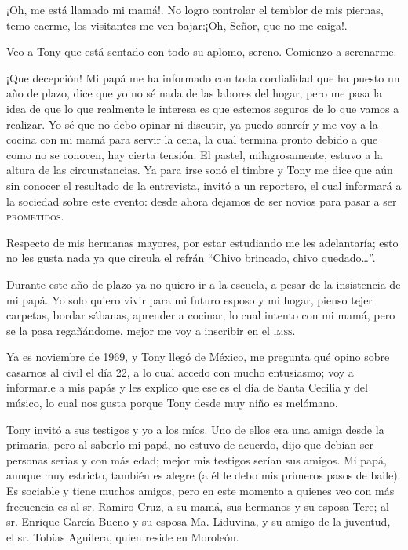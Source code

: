\documentclass[letterpaper, 12pt]{book}
\begin{document}
¡Oh, me está llamado mi mamá!. No logro controlar el temblor de mis piernas, temo caerme, los visitantes me ven bajar:¡Oh, Señor, que no me caiga!.

Veo a Tony que está sentado con todo su aplomo, sereno. Comienzo a serenarme.

¡Que decepción! Mi papá me ha informado con toda cordialidad que ha puesto un año de plazo, dice que yo no sé nada de las labores del hogar, pero me pasa la idea de que lo que realmente le interesa es que estemos seguros de lo que vamos a realizar. Yo sé que no debo opinar ni discutir, ya puedo sonreír y me voy a la cocina con mi mamá para servir la cena, la cual termina pronto debido a que como no se conocen, hay cierta tensión. El pastel, milagrosamente, estuvo a la altura de las circunstancias. Ya para irse sonó el timbre y Tony me dice que aún sin conocer el resultado de la entrevista, invitó a un reportero, el cual informará a la sociedad sobre este evento: desde ahora dejamos de ser novios para pasar a ser \textsc{prometidos}.

Respecto de mis hermanas mayores, por estar estudiando me les adelantaría; esto no les gusta nada ya que circula el refrán ``Chivo brincado, chivo quedado\ldots''.

Durante este año de plazo ya no quiero ir a la escuela, a pesar de la insistencia de mi papá. Yo solo quiero vivir para mi futuro esposo y mi hogar, pienso tejer carpetas, bordar sábanas, aprender a cocinar, lo cual intento con mi mamá, pero se la pasa regañándome, mejor me voy a inscribir en el \textsc{imss}.

Ya es noviembre de 1969, y Tony llegó de México, me pregunta qué opino sobre casarnos al civil el día 22, a lo cual accedo con mucho entusiasmo; voy a informarle a mis papás y les explico que ese es el día de Santa Cecilia y del músico, lo cual nos gusta porque Tony desde muy niño es melómano.

Tony invitó a sus testigos y yo a los míos. Uno de ellos era una amiga desde la primaria, pero al saberlo mi papá, no estuvo de acuerdo, dijo que debían ser personas serias y con más edad; mejor mis testigos serían sus amigos. Mi papá, aunque muy estricto, también es alegre (a él le debo mis primeros pasos de baile). Es sociable y tiene muchos amigos, pero en este momento a quienes veo con más frecuencia es al sr. Ramiro Cruz, a su mamá, sus hermanos y su esposa Tere; al sr. Enrique García Bueno y su esposa Ma. Liduvina, y su amigo de la juventud, el sr. Tobías Aguilera, quien reside en Moroleón.
\end{document}

